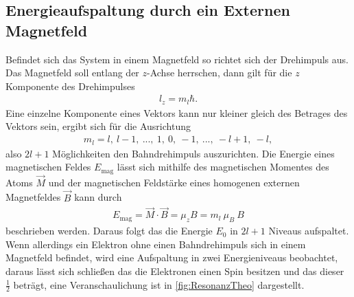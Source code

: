 \subsection{Energieaufspaltung durch ein Externen Magnetfeld}
Befindet sich das System in einem Magnetfeld so richtet sich der Drehimpuls aus.
Das Magnetfeld soll entlang der $z$-Achse herrschen, dann gilt für die $z$ Komponente des Drehimpulses
\begin{align}
	l_z=m_l\hbar.
\end{align}
Eine einzelne Komponente eines Vektors kann nur kleiner gleich des Betrages des Vektors sein, ergibt sich für die Ausrichtung
\begin{align}
	m_l = l,\ l-1,\ ...,\ 1,\ 0,\ -1,\ ... ,\ -l+1,\ -l,
\end{align}
also $2l+1 $ Möglichkeiten den Bahndrehimpuls auszurichten.
Die Energie eines magnetischen Feldes $E_\text{mag}$ lässt sich mithilfe des magnetischen Momentes des Atoms $\vec{M}$ und der magnetischen Feldstärke eines homogenen externen Magnetfeldes $\vec{B}$ kann durch 
\begin{align}
	E_\text{mag}=\vec{M}\cdot\vec{B}=\mu_zB=m_l\ \mu_B\ B\label{eq:Emag}
\end{align}
beschrieben werden. 
Daraus folgt das die Energie $E_0$ in $2l+1$ Niveaus aufspaltet.\\
Wenn allerdings ein Elektron ohne einen Bahndrehimpuls sich in einem Magnetfeld befindet, wird eine Aufspaltung in zwei Energieniveaus beobachtet, daraus lässt sich schließen das die Elektronen einen Spin besitzen und das dieser $\frac{1}{2}$ beträgt, eine Veranschaulichung ist in \cref{fig:ResonanzTheo} dargestellt.
